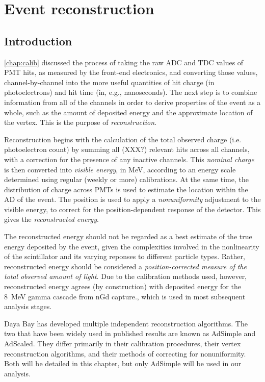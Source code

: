 \documentclass[../thesis.tex]{subfiles}
\begin{document}
\chapter{Event reconstruction}
\label{chap:recon}

\section{Introduction}

\autoref{chap:calib} discussed the process of taking the raw ADC and TDC values
of PMT hits, as measured by the front-end electronics, and converting those
values, channel-by-channel into the more useful quantities of hit charge (in
photoelectrons) and hit time (in, e.g., nanoseconds). The next step is to
combine information from all of the channels in order to derive properties of
the event as a whole, such as the amount of deposited energy and the approximate
location of the vertex. This is the purpose of \emph{reconstruction.}

Reconstruction begins with the calculation of the total observed charge
(i.e. photoelectron count) by summing all (XXX?) relevant hits across all
channels, with a correction for the presence of any inactive channels. This
\emph{nominal charge} is then converted into \emph{visible energy}, in MeV,
according to an energy scale determined using regular (weekly or more)
calibrations. At the same time, the distribution of charge across PMTs is used
to estimate the location within the AD of the event. The position is used to
apply a \emph{nonuniformity} adjustment to the visible energy, to correct for
the position-dependent response of the detector. This gives the
\emph{reconstructed energy}.

The reconstructed energy should not be regarded as a best estimate of the true
energy deposited by the event, given the complexities involved in the
nonlinearity of the scintillator and its varying reponses to different particle
types. Rather, reconstructed energy should be considered a
\emph{position-corrected measure of the total observed amount of light}. Due to
the calibration methods used, however, reconstructed energy agrees (by
construction) with deposited energy for the 8~MeV gamma cascade from nGd
capture., which is used in most subsequent analysis stages.

Daya Bay has developed multiple independent reconstruction algorithms. The two
that have been widely used in published results are known as AdSimple and
AdScaled. They differ primarily in their calibration procedures, their vertex
reconstruction algorithms, and their methods of correcting for
nonuniformity. Both will be detailed in this chapter, but only AdSimple will be
used in our analysis.
\end{document}
